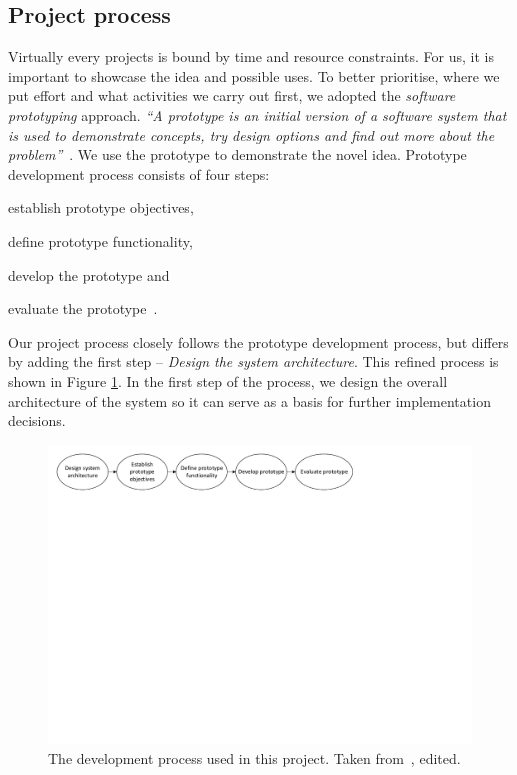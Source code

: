 \subsection{Project process}

Virtually every projects is bound by time and resource constraints. For us, it is important to showcase the idea and possible uses. To better prioritise, where we put effort and what activities we carry out first, we adopted the \textit{software prototyping} approach. \textit{``A prototype is an initial version of a software system that is used to demonstrate concepts, try design options and find out more about the problem''}~\cite{Sommerville2011SoftwareEngineering}. We use the prototype to demonstrate the novel idea. Prototype development process consists of four steps:
\begin{enumerate*}[label=(\roman*)]
    \item establish prototype objectives,
    \item define prototype functionality,
    \item develop the prototype and
    \item evaluate the prototype~\cite{Sommerville2011SoftwareEngineering}.
\end{enumerate*}

Our project process closely follows the prototype development process, but differs by adding the first step -- \textit{Design the system architecture}. This refined process is shown in Figure \ref{fig:prototype-process}. In the first step of the process, we design the overall architecture of the system so it can serve as a basis for further implementation decisions.

\begin{figure}
    \centering
    \includegraphics[width=\textwidth]{prototype-process-m}
    \caption{The development process used in this project. Taken from~\cite[p. 45]{Sommerville2011SoftwareEngineering}, edited.}
    \label{fig:prototype-process}
\end{figure}

